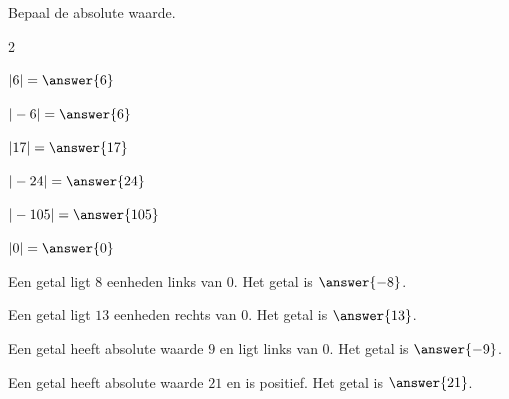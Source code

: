 \documentclass{ximera}
\begin{document}
    \begin{oefening}{\oefB\ESS}
    
    Bepaal de absolute waarde.
    
    \begin{multicols}{2}
        
    \begin{question} \(|6|=\answer{6}\) \end{question}
    
    \begin{question} \(|-6|=\answer{6}\) \end{question}
    
    \begin{question} \(|17|=\answer{17}\) \end{question}
    
    \begin{question} \(|-24|=\answer{24}\) \end{question}
    
    \begin{question} \(|-105|=\answer{105}\) \end{question}
    
    \begin{question} \(|0|=\answer{0}\) \end{question}

    \end{multicols}
    
    \end{oefening}
    
    
    \begin{oefening}{\oefB}
    
    \begin{question}
    Een getal ligt \(8\) eenheden links van \(0\).
    Het getal is \(\answer{-8}\).
    \end{question}
    
    \begin{question}
    Een getal ligt \(13\) eenheden rechts van \(0\).
    Het getal is \(\answer{13}\).
    \end{question}
    
    \begin{question}
    Een getal heeft absolute waarde \(9\) en ligt links van \(0\).
    Het getal is \(\answer{-9}\).
    \end{question}
    
    \begin{question}
    Een getal heeft absolute waarde \(21\) en is positief.
    Het getal is \(\answer{21}\).
    \end{question}
    
    \end{oefening}
    
\end{document}
